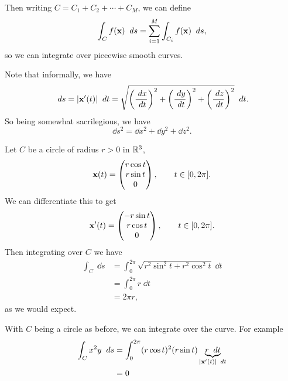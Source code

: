 \documentclass[a4paper]{scrartcl}
\begin{document}
\begin{center}

\end{center}

Then writing $C = C_1 + C_2 + \cdots + C_M$, we can define
$$
\int_C f(\mathbf{x}) \; \; d s = \sum_{i = 1}^M \int_{C_i} f(\mathbf{x}) \; \; d s,
$$
so we can integrate over piecewise smooth curves.

Note that informally, we have 
$$\; d s = |\mathbf{x}'(t)| \; \; d t = \sqrt{\left(\frac{\; d x}{\; d t}\right)^2 + \left(\frac{\; d y}{\; d t}\right)^2 + \left(\frac{\; d z}{\; d t}\right)^2} \; \; d t.$$
So being somewhat sacrilegious, we have
$$
\dd s^2 = \dd x^2 + \dd y^2 + \dd z^2.
$$

\begin{example}
	Let $C$ be a circle of radius $r > 0$ in $\mathbb{R}^3$,
	$$
	\mathbf{x}(t) = \begin{pmatrix}
		r \cos t \\
		r \sin t \\
		0
	\end{pmatrix}, \quad \quad t \in [0, 2 \pi].
	$$
	We can differentiate this to get 
	$$
	\mathbf{x}'(t) = \begin{pmatrix}
		-r \sin t \\
		r \cos t \\
		0
	\end{pmatrix}, \quad \quad t \in [0, 2 \pi].
	$$
	Then integrating over $C$ we have
	\begin{align*}
		\int_C \; \dd s &= \int_0^{2 \pi} \sqrt{r^2 \sin^2 t + r^2 \cos^2 t} \; \dd t\\
		&= \int_0^{2 \pi} r \; \dd t \\
		&= 2 \pi r,
	\end{align*}
	as we would expect.
\end{example}

\begin{example}
	With $C$ being a circle as before, we can integrate over the curve. For example
	\begin{align*}
		\int_C x^2 y \; \; d s &= \int_0^{2 \pi} (r \cos t)^2 (r \sin t) \underbrace{r \; \; d t}_{|\mathbf{x}'(t)| \; \; d t} \\
		&= 0
	\end{align*}
\end{example}
\end{document}
